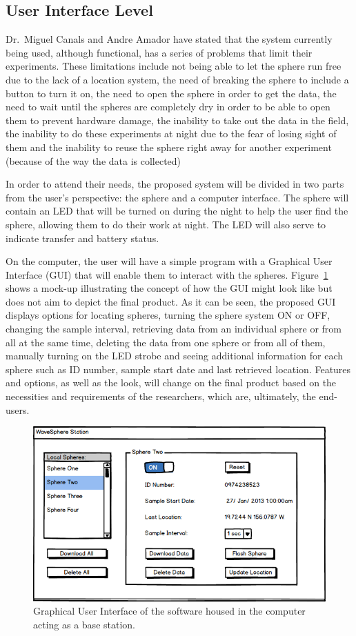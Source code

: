 \subsection{User Interface Level}

Dr.~Miguel Canals and Andre Amador have stated that the system currently being used, although functional, has a series of problems that limit their experiments.  These limitations include not being able to let the sphere run free due to the lack of a location system, the need of breaking the sphere to include a button to turn it on, the need to open the sphere in order to get the data, the need to wait until the spheres are completely dry in order to be able to open them to prevent hardware damage, the inability to take out the data in the field, the inability to do these experiments at night due to the fear of losing sight of them and the inability to reuse the sphere right away for another experiment (because of the way the data is collected) 

In order to attend their needs, the proposed system will be divided in two parts from the user's perspective: the sphere and a computer interface. The sphere will contain an LED that will be turned on during the night to help the user find the sphere, allowing them to do their work at night.  The LED will also serve to indicate transfer and battery status.  

On the computer, the user will have a simple program with a Graphical User Interface (GUI) that will enable them to interact with the spheres. Figure~\ref{fig:gui} shows a mock-up illustrating the concept of how the GUI might look like but does not aim to depict the final product.  As it can be seen, the proposed GUI displays options for locating spheres, turning the sphere system ON or OFF, changing the sample interval, retrieving data from an individual sphere or from all at the same time, deleting the data from one sphere or from all of them, manually turning on the LED strobe and seeing additional information for each sphere such as ID number, sample start date and last retrieved location. Features and options, as well as the look, will change on the final product based on the necessities and requirements of the researchers, which are, ultimately, the end-users.

\begin{figure}[H]
	\centering
	\includegraphics[scale=0.6]{img/gui.png}
	\caption{Graphical User Interface of the software housed in the computer acting as a base station. \label{fig:gui}}
\end{figure}
